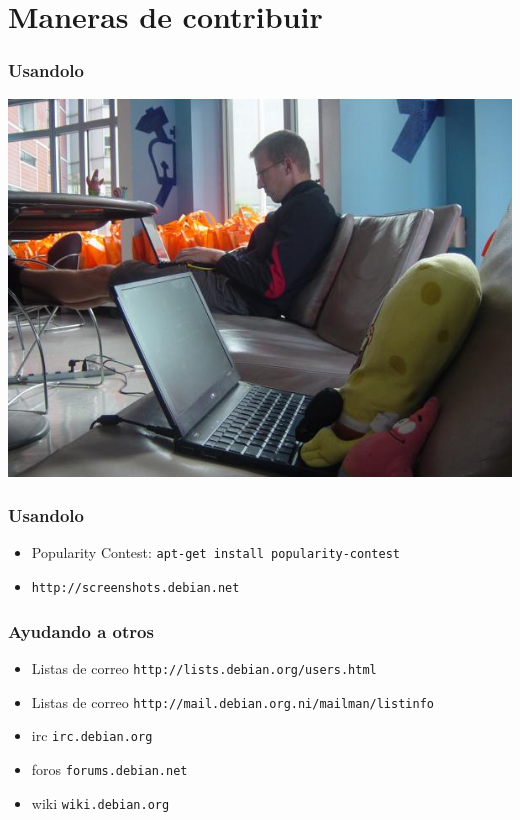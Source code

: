 \documentclass{beamer}
\begin{document}
\section{Maneras de contribuir}
\begin{frame}
\frametitle{Usandolo}
    \begin{center}
             \includegraphics[scale=0.40]{../img/spongebob.JPG}
   \end{center}
\end{frame}

\begin{frame}
\frametitle{Usandolo}
       \begin{itemize}
                \pause \item Popularity Contest: \texttt{apt-get install popularity-contest}
                \pause \item \texttt{http://screenshots.debian.net}
        \end{itemize}
\end{frame}

\begin{frame}
\frametitle{Ayudando a otros}
       \begin{itemize}
                \pause \item Listas de correo \texttt{http://lists.debian.org/users.html}
		\pause \item Listas de correo \texttt{http://mail.debian.org.ni/mailman/listinfo}
                \pause \item irc \texttt{irc.debian.org}
                \pause \item foros \texttt{forums.debian.net}
                \pause \item wiki \texttt{wiki.debian.org}
        \end{itemize}
\end{frame}
\end{document}
